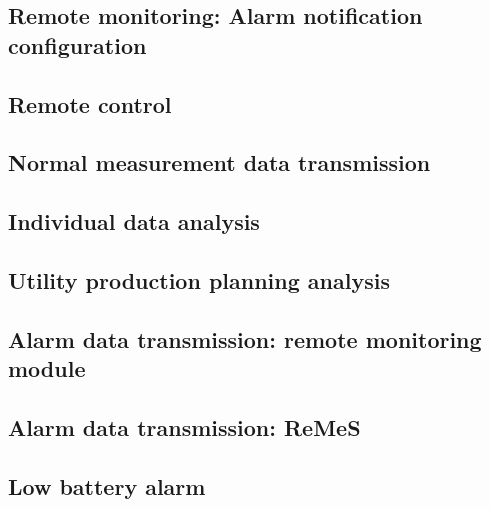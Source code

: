 \subsection{Remote monitoring: Alarm notification configuration}
\label{uc-remote-monitoring-notification-config}


\subsection{Remote control}
\label{uc-remote-control}


\subsection{Normal measurement data transmission}
\label{uc-normal-measurement}


\subsection{Individual data analysis}
\label{uc-individual-analysis}


\subsection{Utility production planning analysis}
\label{uc-production-planning}


\subsection{Alarm data transmission: remote monitoring module}
\label{uc-alarm-transmission-module}


\subsection{Alarm data transmission: ReMeS}
\label{uc-alarm-transmission-remes}


\subsection{Low battery alarm}
\label{uc-low-battery-alarm}


